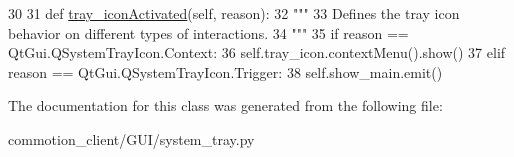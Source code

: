 \begin{DoxyCode}
30 
31     \textcolor{keyword}{def }\hyperlink{classcommotion__client_1_1GUI_1_1system__tray_1_1TrayIcon_a31999bfda4008b7395def282e37b4d5c}{tray\_iconActivated}(self, reason):
32         \textcolor{stringliteral}{"""}
33 \textcolor{stringliteral}{        Defines the tray icon behavior on different types of interactions.}
34 \textcolor{stringliteral}{        """}
35         \textcolor{keywordflow}{if} reason == QtGui.QSystemTrayIcon.Context:
36             self.tray\_icon.contextMenu().show()
37         \textcolor{keywordflow}{elif} reason == QtGui.QSystemTrayIcon.Trigger:
38             self.show\_main.emit()
\end{DoxyCode}


The documentation for this class was generated from the following file\-:\begin{DoxyCompactItemize}
\item 
commotion\-\_\-client/\-G\-U\-I/system\-\_\-tray.\-py\end{DoxyCompactItemize}
